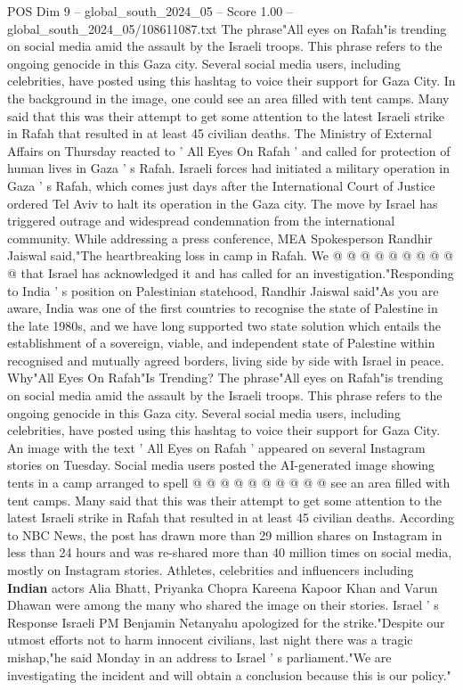 \begin{textsample}{POS Dim 9 – global\_south\_2024\_05 – Score 1.00 – global\_south\_2024\_05/108611087.txt}  \label{ex:f9_pos_042}
The phrase"All eyes on Rafah"is trending on social media amid the assault by the Israeli troops.
This phrase refers to the ongoing genocide in this Gaza city.
Several social media users, including celebrities, have posted using this hashtag to voice their support for Gaza City.
In the background in the image, one could see an area filled with tent camps.
Many said that this was their attempt to get some attention to the latest Israeli strike in Rafah that resulted in at least 45 civilian deaths.
The Ministry of External Affairs on Thursday reacted to ' All Eyes On Rafah ' and called for protection of human lives in Gaza ' s Rafah.
Israeli forces had initiated a military operation in Gaza ' s Rafah, which comes just days after the International Court of Justice ordered Tel Aviv to halt its operation in the Gaza city.
The move by Israel has triggered outrage and widespread condemnation from the international community.
While addressing a press conference, MEA Spokesperson Randhir Jaiswal said,"The heartbreaking loss in camp in Rafah.
We @ @ @ @ @ @ @ @ @ @ that Israel has acknowledged it and has called for an investigation."Responding to India ' s position on Palestinian statehood, Randhir Jaiswal said"As you are aware, India was one of the first countries to recognise the state of Palestine in the late 1980s, and we have long supported two state solution which entails the establishment of a sovereign, viable, and independent state of Palestine within recognised and mutually agreed borders, living side by side with Israel in peace.
Why"All Eyes On Rafah"Is Trending?
The phrase"All eyes on Rafah"is trending on social media amid the assault by the Israeli troops.
This phrase refers to the ongoing genocide in this Gaza city.
Several social media users, including celebrities, have posted using this hashtag to voice their support for Gaza City.
An image with the text ' All Eyes on Rafah ' appeared on several Instagram stories on Tuesday.
Social media users posted the AI-generated image showing tents in a camp arranged to spell @ @ @ @ @ @ @ @ @ @ see an area filled with tent camps.
Many said that this was their attempt to get some attention to the latest Israeli strike in Rafah that resulted in at least 45 civilian deaths.
According to NBC News, the post has drawn more than 29 million shares on Instagram in less than 24 hours and was re-shared more than 40 million times on social media, mostly on Instagram stories.
Athletes, celebrities and influencers including \textbf{Indian} actors Alia Bhatt, Priyanka Chopra Kareena Kapoor Khan and Varun Dhawan were among the many who shared the image on their stories.
Israel ' s Response Israeli PM Benjamin Netanyahu apologized for the strike."Despite our utmost efforts not to harm innocent civilians, last night there was a tragic mishap,"he said Monday in an address to Israel ' s parliament."We are investigating the incident and will obtain a conclusion because this is our policy."

\end{textsample}
